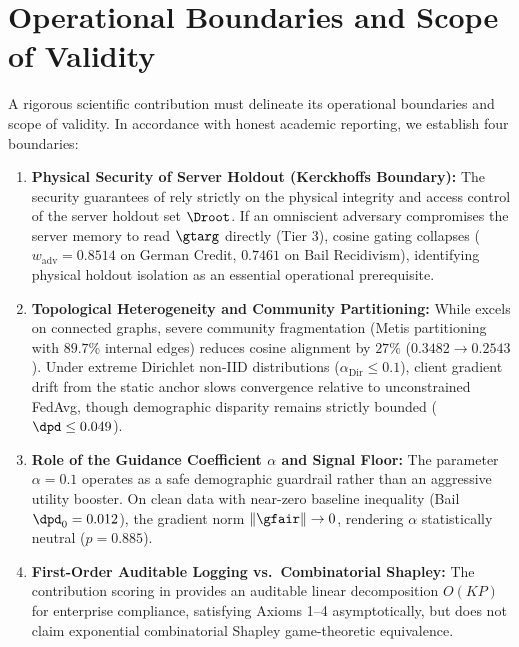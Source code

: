 \section{Operational Boundaries and Scope of Validity}
\label{sec:limitations}

A rigorous scientific contribution must delineate its operational boundaries and scope of validity. In accordance with honest academic reporting, we establish four boundaries:

\begin{enumerate}
    \item \textbf{Physical Security of Server Holdout (Kerckhoffs Boundary):} The security guarantees of \MethodName{} rely strictly on the physical integrity and access control of the server holdout set $\Droot$. If an omniscient adversary compromises the server memory to read $\gtarg$ directly (Tier 3), cosine gating collapses ($w_{\mathrm{adv}} = 0.8514$ on German Credit, $0.7461$ on Bail Recidivism), identifying physical holdout isolation as an essential operational prerequisite.
    \item \textbf{Topological Heterogeneity and Community Partitioning:} While \MethodName{} excels on connected graphs, severe community fragmentation (Metis partitioning with $89.7\%$ internal edges) reduces cosine alignment by $27\%$ ($0.3482 \to 0.2543$). Under extreme Dirichlet non-IID distributions ($\alpha_{\mathrm{Dir}} \le 0.1$), client gradient drift from the static anchor slows convergence relative to unconstrained FedAvg, though demographic disparity remains strictly bounded ($\dpd \le 0.049$).
    \item \textbf{Role of the Guidance Coefficient $\alpha$ and Signal Floor:} The parameter $\alpha = 0.1$ operates as a safe demographic guardrail rather than an aggressive utility booster. On clean data with near-zero baseline inequality (Bail $\dpd_0 = 0.012$), the gradient norm $\|\gfair\| \to 0$, rendering $\alpha$ statistically neutral ($p = 0.885$).
    \item \textbf{First-Order Auditable Logging vs.\ Combinatorial Shapley:} The contribution scoring in \MethodName{} provides an auditable linear decomposition $O(KP)$ for enterprise compliance, satisfying Axioms 1--4 asymptotically, but does not claim exponential combinatorial Shapley game-theoretic equivalence.
\end{enumerate}

